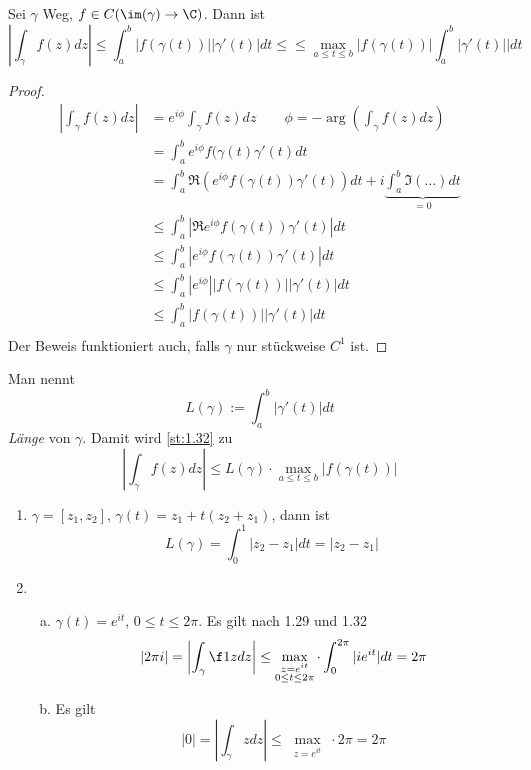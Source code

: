 \documentclass[a4paper,10pt]{scrartcl}
\begin{document}
\begin{st}
	\label{st:1.32}
	Sei $\gamma$ Weg, $f\in C(\im(\gamma) \to \C)$.
	Dann ist
	\[
		\left| \int_\gamma f(z) dz \right| \le \int_a^b |f(\gamma(t))| |\gamma'(t)| dt \le
\le \max_{a\le t \le b} |f(\gamma(t))| \int_a^b |\gamma'(t)|| dt
	\]
	\begin{proof}
		\begin{align*}
			\left| \int_\gamma f(z) dz \right| &= e^{i\phi} \int_\gamma f(z) dz \qquad \phi= -\arg\left(\int_\gamma f(z)dz\right)\\
			&= \int_a^b e^{i\phi} f(\gamma(t) \gamma'(t) dt \\
			&= \int_a^b \Re\left(e^{i\phi} f(\gamma(t)) \gamma'(t)\right)dt + i \underbrace{\int_a^b \Im\left( \dotso\right)dt}_{=0} \\
			&\le \int_a^b |\Re e^{i\phi} f(\gamma(t)) \gamma'(t)| dt\\
			&\le \int_a^b |e^{i\phi} f(\gamma(t)) \gamma'(t)| dt\\
			&\le \int_a^b |e^{i\phi}| |f(\gamma(t))| |\gamma'(t)| dt\\
			&\le \int_a^b |f(\gamma(t))| |\gamma'(t)| dt\\
		\end{align*}
		Der Beweis funktioniert auch, falls $\gamma$ nur stückweise $C^1$ ist.
	\end{proof}
\end{st}

\begin{df}
	\label{df:1.33}
	Man nennt
	\[
		L(\gamma) := \int_a^b |\gamma'(t)| dt
	\]
	\emph{Länge} von $\gamma$.
	Damit wird \ref{st:1.32} zu
	\[
		\left| \int_\gamma f(z) dz \right| \le L(\gamma) \cdot \max_{a\le t\le b}|f(\gamma(t))|
	\]
\end{df}

\begin{ex}
	\begin{enumerate}[1)]
		\item 
			$\gamma=[z_1,z_2]$, $\gamma(t) = z_1+t(z_2+z_1)$, dann ist
			\[
				L(\gamma) = \int_0^1 |z_2-z_1| dt = |z_2-z_1|
			\]
		\item
			\begin{enumerate}[a)]
				\item 
					$\gamma(t) = e^{it}$, $0\le t\le 2\pi$.
					Es gilt nach 1.29 und 1.32
					\[
						|2\pi i| = \left| \int_\gamma \f 1z dz \right| \le \max_{\substack{z=e^{it}\\0\le t \le 2\pi}} \cdot \int_0^{2\pi} |ie^{it}| dt = 2\pi
					\]
				\item
					Es gilt
					\[
						|0| = \left|\int_\gamma z dz\right| \le \max_{\substack{z=e^{it}}} \cdot 2\pi = 2\pi
					\]
			\end{enumerate}
	\end{enumerate}
\end{ex}
\end{document}
